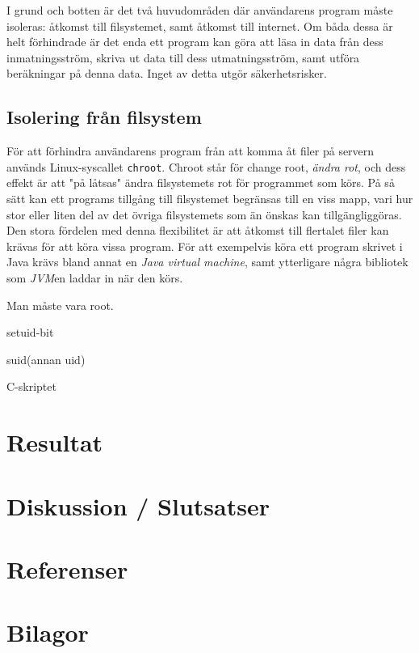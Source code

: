 \documentclass[swedish]{article}
\begin{document}
I grund och botten är det två huvudområden där användarens program måste
isoleras: åtkomst till filsystemet, samt åtkomst till internet. Om båda dessa är
helt förhindrade är det enda ett program kan göra att läsa in data från dess
inmatningsström, skriva ut data till dess utmatningsström, samt utföra
beräkningar på denna data. Inget av detta utgör säkerhetsrisker.

\subsection{Isolering från filsystem}

För att förhindra användarens program från att komma åt filer på servern används
Linux-syscallet \texttt{chroot}. Chroot står för change root,
\textit{ändra rot}, och dess effekt är att "på låtsas" ändra filsystemets rot
för programmet som körs. På så sätt kan ett programs tillgång till filsystemet
begränsas till en viss mapp, vari hur stor eller liten del av det övriga
filsystemets som än önskas kan tillgängliggöras. Den stora fördelen med denna
flexibilitet är att åtkomst till flertalet filer kan krävas för att köra vissa
program. För att exempelvis köra ett program skrivet i Java krävs bland annat en
\textit{Java virtual machine}, samt ytterligare några bibliotek som
\textit{JVM}en laddar in när den körs.

Man måste vara root.

setuid-bit

suid(annan uid)

C-skriptet

\section{Resultat}

\section{Diskussion / Slutsatser}

\section{Referenser}

\section{Bilagor}
\end{document}
